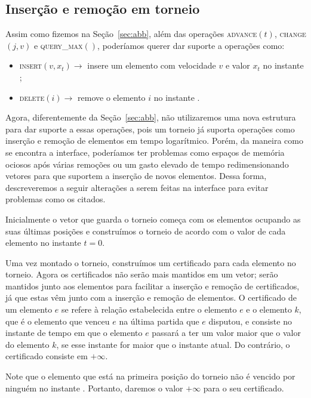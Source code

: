 
\FloatBarrier

\subsection{Inserção e remoção em torneio} \label{subsec:torneioi:secao}

Assim como fizemos na Seção~\ref{sec:abb}, além das operações
\textsc{advance}$(t)$, \textsc{change}$(j, v)$ e
\textsc{query\_max}$()$, poderíamos querer dar suporte a operações
como:

\begin{itemize}
    \item \textsc{insert}$(v, x_t)\rightarrow$ insere um elemento
    com velocidade $v$ e valor $x_t$ no instante \now;
    \item \textsc{delete}$(i) \rightarrow$ remove o elemento $i$ no
    instante \now.
\end{itemize}
Agora, diferentemente da Seção~\ref{sec:abb}, não utilizaremos uma nova estrutura para dar suporte
a essas operações, pois um torneio já suporta operações como inserção e remoção de elementos em
tempo logarítmico.
Porém, da maneira como se encontra a interface, poderíamos ter problemas como espaços de memória
ociosos após várias remoções ou um gasto elevado de tempo redimensionando vetores para que
suportem a inserção de novos elementos.
Dessa forma, descreveremos a seguir alterações a serem feitas na interface para evitar problemas
como os citados.

Inicialmente o vetor que guarda o torneio começa com os elementos ocupando as suas últimas
posições e construímos o torneio de acordo com o valor de cada elemento no instante $t = 0$.

Uma vez montado o torneio, construímos um certificado para cada elemento no torneio.
Agora os certificados não serão mais mantidos em um vetor;
serão mantidos junto aos elementos para facilitar a inserção e remoção de certificados, já que
estas vêm junto com a inserção e remoção de elementos.
O certificado de um elemento $e$ se refere à relação estabelecida entre o elemento $e$ e o
elemento $k$, que é o elemento que venceu $e$ na última partida que $e$ disputou, e consiste no
instante de tempo em que o elemento $e$ passará a ter um valor maior que o valor do elemento $k$,
se esse instante for maior que o instante atual.
Do contrário, o certificado consiste em $+\infty$.

Note que o elemento que está na primeira posição do torneio não é vencido por ninguém no instante
\now.
Portanto, daremos o valor $+\infty$ para o seu certificado.

